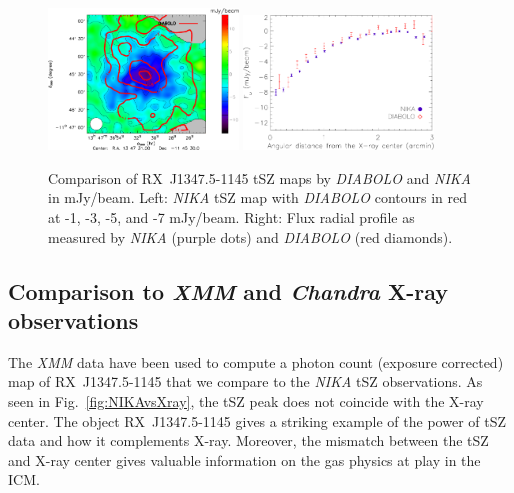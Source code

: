 	\begin{figure}
	\centering
	\includegraphics[width=0.45\textwidth]{Figure/RXJ1347-1145_NIKAvsDIABOLO_PS_subtracted}
	\hspace*{0.5cm}
	\includegraphics[width=0.45\textwidth]{Figure/profile_DIABOLO_vs_NIKA}
	\caption{Comparison of \mbox{RX~J1347.5-1145} tSZ maps by {\it DIABOLO} and {\it NIKA} in mJy/beam. Left: {\it NIKA} tSZ map with {\it DIABOLO} contours in red at -1, -3, -5, and -7 mJy/beam. Right: Flux radial profile as measured by {\it NIKA} (purple dots) and {\it DIABOLO} (red diamonds).}
        \label{fig:NIKAvsDIABOLO}
	\end{figure}

\subsection{Comparison to {\it XMM} and {\it Chandra} \mbox{X-ray} observations}
\label{sec:comp_x}
The {\it XMM} data \citep{gitti_2004} have been used to compute a photon count (exposure corrected) map of \mbox{RX~J1347.5-1145} that we compare to the {\it NIKA} tSZ observations. As seen in Fig.~\ref{fig:NIKAvsXray}, the tSZ peak does not coincide with the \mbox{X-ray} center. The object \mbox{RX~J1347.5-1145} gives a striking example of the power of tSZ data and how it complements \mbox{X-ray}. Moreover, the mismatch between the tSZ and \mbox{X-ray} center gives valuable information on the gas physics at play in the ICM.

